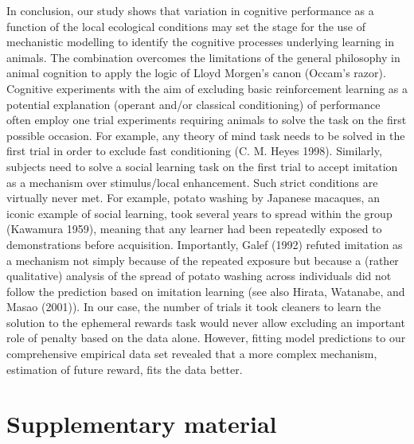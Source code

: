 \documentclass[
  12pt,
]{article}
\newcommand{\beginsupplement}{ \setcounter{table}{0}             \renewcommand{\thetable}{S\arabic{table}}\setcounter{figure}{0} \renewcommand{\thefigure}{S\arabic{figure}}}
\begin{document}
In conclusion, our study shows that variation in cognitive performance
as a function of the local ecological conditions may set the stage for
the use of mechanistic modelling to identify the cognitive processes
underlying learning in animals. The combination overcomes the
limitations of the general philosophy in animal cognition to apply the
logic of Lloyd Morgen's canon (Occam's razor). Cognitive experiments
with the aim of excluding basic reinforcement learning as a potential
explanation (operant and/or classical conditioning) of performance often
employ one trial experiments requiring animals to solve the task on the
first possible occasion. For example, any theory of mind task needs to
be solved in the first trial in order to exclude fast conditioning (C.
M. Heyes 1998). Similarly, subjects need to solve a social learning task
on the first trial to accept imitation as a mechanism over
stimulus/local enhancement. Such strict conditions are virtually never
met. For example, potato washing by Japanese macaques, an iconic example
of social learning, took several years to spread within the group
(Kawamura 1959), meaning that any learner had been repeatedly exposed to
demonstrations before acquisition. Importantly, Galef (1992) refuted
imitation as a mechanism not simply because of the repeated exposure but
because a (rather qualitative) analysis of the spread of potato washing
across individuals did not follow the prediction based on imitation
learning (see also Hirata, Watanabe, and Masao (2001)). In our case, the
number of trials it took cleaners to learn the solution to the ephemeral
rewards task would never allow excluding an important role of penalty
based on the data alone. However, fitting model predictions to our
comprehensive empirical data set revealed that a more complex mechanism,
estimation of future reward, fits the data better.

\newpage

\hypertarget{supplementary-material}{%
\section{Supplementary material}\label{supplementary-material}}

\beginsupplement
\end{document}
